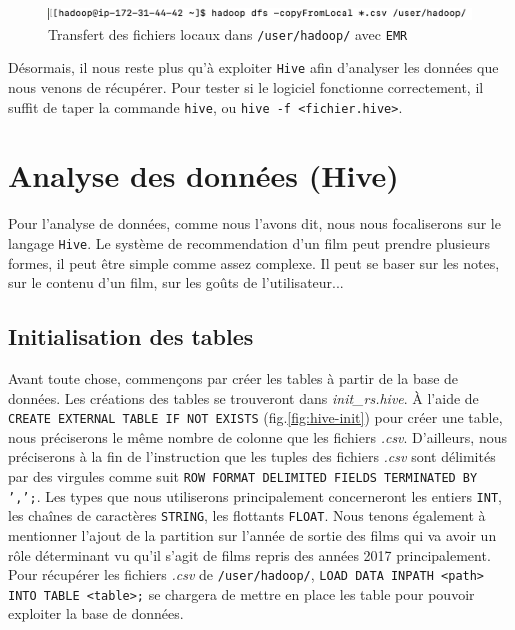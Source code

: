 \documentclass[a4paper, 12pt, oneside]{book}
\begin{document}
\begin{figure}[H]
  \centering
  \includegraphics[width=1.0\textwidth]{images/terminal-fromLocal}
  \caption{Transfert des fichiers locaux dans \texttt{/user/hadoop/} avec \texttt{EMR}}
  \label{fig:terminal-fromLocal}
\end{figure}

Désormais, il nous reste plus qu'à exploiter \texttt{Hive} afin d'analyser les données que nous venons de récupérer. Pour tester si le logiciel fonctionne correctement, il suffit de taper la commande \texttt{hive}, ou \texttt{hive -f <fichier.hive>}.

\chapter{Analyse des données (Hive)}
Pour l'analyse de données, comme nous l'avons dit, nous nous focaliserons sur le langage \texttt{Hive}. Le système de recommendation d'un film peut prendre plusieurs formes, il peut être simple comme assez complexe. Il peut se baser sur les notes, sur le contenu d'un film, sur les goûts de l'utilisateur...

\section{Initialisation des tables}
Avant toute chose, commençons par créer les tables à partir de la base de données. Les créations des tables se trouveront dans \textit{init\_rs.hive}. À l'aide de \texttt{CREATE EXTERNAL TABLE IF NOT EXISTS} (fig.\ref{fig:hive-init}) pour créer une table, nous préciserons le même nombre de colonne que les fichiers \textit{.csv}. D'ailleurs, nous préciserons à la fin de l'instruction que les tuples des fichiers \textit{.csv} sont délimités par des virgules comme suit \texttt{ROW FORMAT DELIMITED FIELDS TERMINATED BY ',';}. Les types que nous utiliserons principalement concerneront les entiers \texttt{INT}, les chaînes de caractères \texttt{STRING}, les flottants \texttt{FLOAT}. 
\newline
Nous tenons également à mentionner l'ajout de la partition sur l'année de sortie des films qui va avoir un rôle déterminant vu qu'il s'agit de films repris des années 2017 principalement. Pour récupérer les fichiers \textit{.csv} de \texttt{/user/hadoop/}, \texttt{LOAD DATA INPATH <path> INTO TABLE <table>;} se chargera de mettre en place les table pour pouvoir exploiter la base de données.
\end{document}
